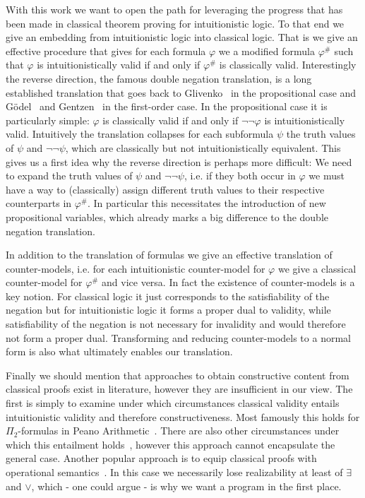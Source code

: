 \documentclass[a4paper,UKenglish,cleveref, autoref, thm-restate]{lipics-v2021}
\begin{document}
With this work we want to open the path for leveraging the progress that has been made in classical theorem proving for intuitionistic logic. To that end we give an embedding from intuitionistic logic into classical logic. That is we give an effective procedure that gives for each formula $\varphi$ we a modified formula $\varphi^\#$ such that $\varphi$ is intuitionistically valid if and only if $\varphi^\#$ is classically valid. Interestingly the reverse direction, the famous double negation translation, is a long established translation that goes back to Glivenko~\cite{glivenko1929quelques} in the propositional case and G\"odel~\cite{godel1933intuitionistischen} and Gentzen~\cite{gentzen1936widerspruchsfreiheit} in the first-order case. In the propositional case it is particularly simple: $\varphi$ is classically valid if and only if $\neg\neg\varphi$ is intuitionistically valid. Intuitively the translation collapses for each subformula $\psi$ the truth values of $\psi$ and $\neg\neg\psi$, which are classically but not intuitionistically equivalent. This gives us a first idea why the reverse direction is perhaps more difficult: We need to expand the truth values of $\psi$ and $\neg\neg\psi$, i.e. if they both occur in $\varphi$ we must have a way to (classically) assign different truth values to their respective counterparts in $\varphi^\#$. In particular this necessitates the introduction of new propositional variables, which already marks a big difference to the double negation translation.

In addition to the translation of formulas we give an effective translation of counter-models, i.e. for each intuitionistic counter-model for $\varphi$ we give a classical counter-model for $\varphi^\#$ and vice versa. In fact the existence of counter-models is a key notion. For classical logic it just corresponds to the satisfiability of the negation but for intuitionistic logic it forms a proper dual to validity, while satisfiability of the negation is not necessary for invalidity and would therefore not form a proper dual. Transforming and reducing counter-models to a normal form is also what ultimately enables our translation.

Finally we should mention that approaches to obtain constructive content from classical proofs exist in literature, however they are insufficient in our view. The first is simply to examine under which circumstances classical validity entails intuitionistic validity and therefore constructiveness. Most famously this holds for $\Pi_2$-formulas in Peano Arithmetic~\cite{friedman1978classically}. There are also other circumstances under which this entailment holds~\cite{schwichtenberg}, however this approach cannot encapsulate the general case. Another popular approach is to equip classical proofs with operational semantics~\cite{Control1, Parigot1}. In this case we necessarily lose realizability at least of $\exists$ and $\vee$, which - one could argue - is why we want a program in the first place.
\end{document}
